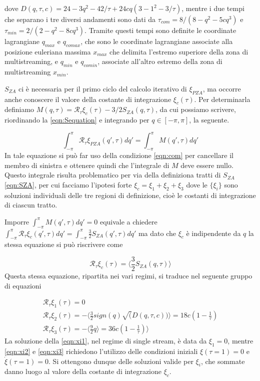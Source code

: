 dove $D(q, \tau, c) = 24 - 3q^2 -42/\tau + 24cq(3-1^2-3/\tau)$, mentre i due tempi che separano 
i tre diversi andamenti sono dati da $\tau_{com} = 8/(8-q^2-5cq^3)$ e $\tau_{min} = 2/(2-q^2-8cq^3)$.
Tramite questi tempi sono definite le coordinate lagrangiane $q_{max}$ e $q_{comax}$, che sono le 
coordinate lagrangiane associate alla posizione euleriana massima $x_{max}$ che delimita l'estremo
superiore della zona di multistreaming, e $q_{min}$ e $q_{comin}$, associate all'altro estremo 
della zona di multistreaming $x_{min}$. 

$S_{ZA}$ ci è necessaria per il primo ciclo del calcolo iterativo di $\xi_{PZA}$, ma occorre anche
conoscere il valore della costante di integrazione $\xi_c(\tau)$. Per determinarla definiamo 
$M(q, \tau) = \mathcal{R}_{\tau} \xi_c (\tau)- 3/2 S_{ZA}(q,\tau)$, da cui possiamo scrivere, 
riordinando la \ref{eqn:Sequation} e integrando per $q \in [-\pi, \pi]$, la seguente.

\begin{equation}
    \int_{-\pi}^{\pi} \mathcal{R}_{\tau}\xi_{PZA}(q', \tau)dq' = \int_{-\pi}^{\pi} M(q', \tau) dq'
\end{equation}
In tale equazione si può far uso della condizione \ref{eqn:com} per cancellare il membro di sinistra
e ottenere quindi che l'integrale di $M$ deve essere nullo. Questo integrale risulta problematico
per via della definiziona tratti di $S_{ZA}$ \ref{eqn:SZA}, per cui facciamo l'ipotesi forte 
$\xi_c = \xi_1 + \xi_2 + \xi_3$ dove le $\{\xi_i\}$ sono soluzioni individuali delle tre regioni 
di definizione, cioè le costanti di integrazione di ciascun tratto.

Imporre $\int_{-\pi}^{\pi} M(q', \tau) dq' = 0$ equivale a chiedere 
$\int_{-\pi}^{\pi} \mathcal{R}_{\tau}\xi_c(q', \tau) dq' = \int_{-\pi}^{\pi} \frac{3}{2} S_{ZA}(q', \tau) dq'$
ma dato che $\xi_c$ è indipendente da $q$ la stessa equazione si può riscrivere come

\begin{equation}
    \mathcal{R}_{\tau} \xi_c(\tau) = \Big\langle \frac{3}{2}S_{ZA}(q, \tau) \Big\rangle
\end{equation}
Questa stessa equazione, ripartita nei vari regimi, si traduce nel seguente gruppo di equazioni

\begin{gather}
    \label{eqn:xi1}
    \mathcal{R}_{\tau} \xi_1(\tau) = 0 \\
    \label{eqn:xi2}
    \mathcal{R}_{\tau} \xi_2(\tau) = - \Big\langle \frac{3}{2} sign(q) \sqrt(D(q, \tau, c)) \Big\rangle = 18c (1-\frac{1}{\tau}) \\
    \label{eqn:xi3}
    \mathcal{R}_{\tau} \xi_3(\tau) = - \Big \langle \frac{9}{2} q \Big \rangle = 36c (1-\frac{1}{\tau})\Big\rangle 
\end{gather}
La soluzione della \ref{eqn:xi1}, nel regime di single stream, è data da $\xi_1=0$, mentre \ref{eqn:xi2} 
e \ref{eqn:xi3} richiedono l'utilizzo delle condizioni iniziali $\xi(\tau=1)=0$ e $\dot{\xi}(\tau=1)=0$.
Si ottengono dunque delle soluzioni valide per $\xi_i$, che sommate danno luogo al valore della costante
di integrazione $\xi_c$.

